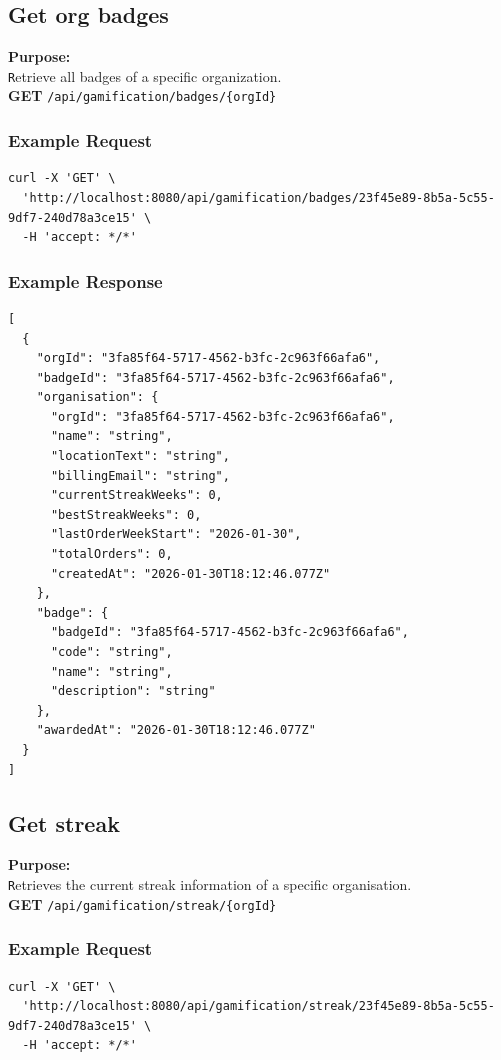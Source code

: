 \documentclass[a4paper,11pt]{article}
\begin{document}
\subsection{Get org badges}
\textbf{Purpose:} \\ \texttt Retrieve all badges of a specific organization. \\

\textbf{GET} \texttt{/api/gamification/badges/\{orgId\}}

\subsubsection*{Example Request}
\begin{lstlisting}
curl -X 'GET' \
  'http://localhost:8080/api/gamification/badges/23f45e89-8b5a-5c55-9df7-240d78a3ce15' \
  -H 'accept: */*'
\end{lstlisting}

\subsubsection*{Example Response}
\begin{lstlisting}
[
  {
    "orgId": "3fa85f64-5717-4562-b3fc-2c963f66afa6",
    "badgeId": "3fa85f64-5717-4562-b3fc-2c963f66afa6",
    "organisation": {
      "orgId": "3fa85f64-5717-4562-b3fc-2c963f66afa6",
      "name": "string",
      "locationText": "string",
      "billingEmail": "string",
      "currentStreakWeeks": 0,
      "bestStreakWeeks": 0,
      "lastOrderWeekStart": "2026-01-30",
      "totalOrders": 0,
      "createdAt": "2026-01-30T18:12:46.077Z"
    },
    "badge": {
      "badgeId": "3fa85f64-5717-4562-b3fc-2c963f66afa6",
      "code": "string",
      "name": "string",
      "description": "string"
    },
    "awardedAt": "2026-01-30T18:12:46.077Z"
  }
]
\end{lstlisting}

\subsection{Get streak}
\textbf{Purpose:} \\ \texttt Retrieves the current streak information of a specific organisation. \\

\textbf{GET} \texttt{/api/gamification/streak/\{orgId\}} 

\subsubsection*{Example Request}
\begin{lstlisting}
curl -X 'GET' \
  'http://localhost:8080/api/gamification/streak/23f45e89-8b5a-5c55-9df7-240d78a3ce15' \
  -H 'accept: */*'
\end{lstlisting}
\end{document}
